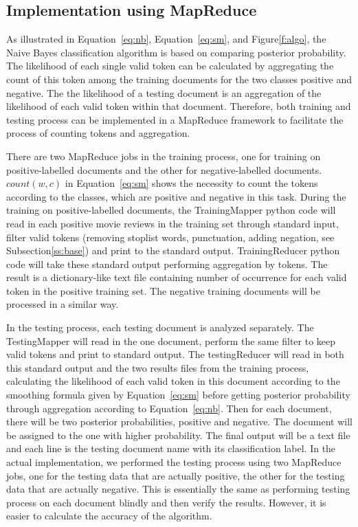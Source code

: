 \subsection{Implementation using MapReduce}

As illustrated in Equation~\ref{eq:nb}, Equation~\ref{eq:sm}, and 
Figure\ref{f:algo}, the Naive Bayes classification algorithm is based on 
comparing posterior probability. The likelihood of each single valid token can 
be calculated by aggregating the count of this token among the training 
documents for the two classes positive and negative. The the likelihood of a 
testing document is an aggregation of the likelihood of each valid token 
within that document. Therefore, both training and testing process can be 
implemented in a MapReduce framework to facilitate the process of counting 
tokens and aggregation. 

There are two MapReduce jobs in the training process, one for training on 
positive-labelled documents and the other for negative-labelled documents. 
$count(w,c)$ in Equation~\ref{eq:sm} shows the necessity to count the 
tokens according to the classes, which are positive and negative in this task. 
During the training on positive-labelled documents, the TrainingMapper 
python code will read in each positive movie reviews in the training set 
through standard input, filter valid tokens (removing stoplist words, 
punctuation, adding negation, see Subsection\ref{ss:base}) and print to the 
standard output. TrainingReducer python code will take these standard 
output performing aggregation by tokens. The result is a dictionary-like text 
file containing number of occurrence for each valid token in the positive 
training set. The negative training documents will be processed in a similar 
way. 

 In the testing process, each testing document is analyzed separately. The 
 TestingMapper will read in the one document, perform the same filter to 
 keep valid tokens and print to standard output. The testingReducer will read 
 in both this standard output and the two results files from the training 
 process, calculating the likelihood of each valid token in this document 
 according to the smoothing formula given by Equation~\ref{eq:sm} before 
 getting posterior probability through aggregation according to 
 Equation~\ref{eq:nb}. Then for each document, there will be two posterior 
 probabilities, positive and negative. The document will be assigned to the 
 one with higher probability. The final output will be a text file and each line is 
 the testing document name with its classification label. In the actual 
 implementation, we performed the testing process using two MapReduce 
 jobs, one for the testing data that are actually positive, the other for the 
 testing data that are actually negative. This is essentially the same as 
 performing testing process on each document blindly and then verify the 
 results. However, it is easier to calculate the accuracy of the algorithm. 
 
